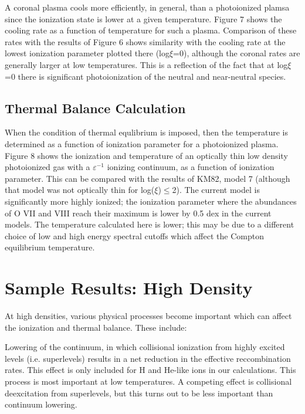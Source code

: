 A coronal plasma cools more efficiently, in general, than a photoionized plamsa
since the ionization state is lower at a given temperature.  Figure 7 shows the cooling rate 
as a function of temperature for such a plasma.  Comparison of these 
rates with the results of Figure 6 shows similarity with the cooling 
rate at the lowest ionization parameter plotted there (log$\xi$=0), although
the coronal rates are generally larger at low temperatures.  This is 
a reflection of the fact that at log$\xi$=0 there is significant photoionization 
of the neutral and near-neutral species.


\subsection{Thermal Balance Calculation}

When the condition of thermal equlibrium is imposed,  then the temperature
is determined as a function of ionization parameter for a photoionized plasma.
Figure 8 shows the ionization and temperature of an optically 
thin low density photoionized gas with a $\varepsilon^{-1}$ ionizing continuum,  
as a function of ionization parameter.  This can be compared with 
the results of KM82, model 7 (although that model was not optically thin 
for log($\xi$)$\leq$2).  The current model is significantly more 
highly ionized; the ionization parameter where the 
abundances of O VII and VIII reach their maximum is lower by 0.5 dex in the 
current models.   The temperature calculated here is lower; this may be due to 
a different choice of low and high energy spectral cutoffs which affect the 
Compton equilibrium temperature.  

\section{ Sample Results: High Density }

At high densities, various physical processes become important 
which can affect the ionization and thermal balance.  These include:

Lowering of the continuum, in which collisional ionization from 
highly excited levels (i.e. superlevels) results in a net reduction 
in the effective reccombination rates.  This effect is only included for 
H and He-like ions in our calculations. This process is most important 
at low temperatures.  A competing effect is collisional 
deexcitation from superlevels, but this turns out to be less important than 
continuum lowering.

